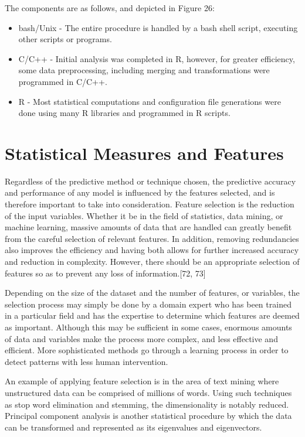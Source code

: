 \documentclass[11pt,]{article}
\begin{document}
\newpage

The components are as follows, and depicted in Figure 26:

\begin{itemize}
\itemsep1pt\parskip0pt
\item
  bash/Unix - The entire procedure is handled by a bash shell script,
  executing other scripts or programs.
\item
  C/C++ - Initial analysis was completed in R, however, for greater
  efficiency, some data preprocessing, including merging and
  transformations were programmed in C/C++.
\item
  R - Most statistical computations and configuration file generations
  were done using many R libraries and programmed in R scripts.
\end{itemize}

\clearpage

\section{Statistical Measures and
Features}\label{statistical-measures-and-features}

Regardless of the predictive method or technique chosen, the predictive
accuracy and performance of any model is influenced by the features
selected, and is therefore important to take into consideration. Feature
selection is the reduction of the input variables. Whether it be in the
field of statistics, data mining, or machine learning, massive amounts
of data that are handled can greatly benefit from the careful selection
of relevant features. In addition, removing redundancies also improves
the efficiency and having both allows for further increased accuracy and
reduction in complexity. However, there should be an appropriate
selection of features so as to prevent any loss of information.{[}72,
73{]}

Depending on the size of the dataset and the number of features, or
variables, the selection process may simply be done by a domain expert
who has been trained in a particular field and has the expertise to
determine which features are deemed as important. Although this may be
sufficient in some cases, enormous amounts of data and variables make
the process more complex, and less effective and efficient. More
sophisticated methods go through a learning process in order to detect
patterns with less human intervention.

An example of applying feature selection is in the area of text mining
where unstructured data can be comprised of millions of words. Using
such techniques as stop word elimination and stemming, the
dimensionality is notably reduced. Principal component analysis is
another statistical procedure by which the data can be transformed and
represented as its eigenvalues and eigenvectors.
\end{document}
